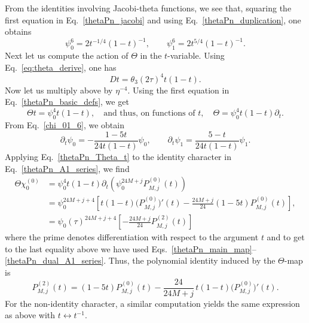 \documentclass[11pt]{article}
\newcommand\be{\begin{equation}}
\newcommand\ee{\end{equation}}
\begin{document}
From the identities involving Jacobi-theta functions, we see that, squaring the first equation in Eq.~\eqref{thetaPn_jacobi} and using Eq.~\eqref{thetaPn_duplication}, one obtains
\begin{equation}
    \psi_0^6
    =
    2t^{-1/4}(1-t)^{-1},
    \qquad
    \psi_1^6
    =
    2t^{5/4}(1-t)^{-1}.
    \label{chi_01_6}
\end{equation}
Next let us compute the action of $\Theta$ in the $t$-variable. Using Eq.~\eqref{eq:theta_derive}, one has
\begin{equation}
    Dt
    =
    \theta_3(2\tau)^4t(1-t).
    \label{thetaPn_Dt}
\end{equation}
Now let us multiply above by $\eta^{-4}$. Using the first equation in Eq.~\eqref{thetaPn_basic_defs}, we get
\begin{equation}
    \Theta t
    =
    \psi_0^4t(1-t), \quad \text{and thus, on functions of }t, \quad \Theta
    =
    \psi_0^4t(1-t)\partial_t.
    \label{thetaPn_Theta_t}
\end{equation}
From Eq.~\eqref{chi_01_6}, we obtain
\begin{equation}
    \partial_t\psi_0
    =
    -\frac{1-5t}{24t(1-t)}\psi_0,
    \qquad
    \partial_t\psi_1
    =
    \frac{5-t}{24t(1-t)}\psi_1.
    \label{thetaPn_dchi}
\end{equation}
Applying Eq.~\eqref{thetaPn_Theta_t} to the identity character in
Eq.~\eqref{thetaPn_A1_series}, we find
\be
\begin{aligned}
    \Theta\chi^{(0)}_{0}
    &=
    \psi_0^4t(1-t)\partial_t
    \left(
        \psi_0^{24M+j}P^{(0)}_{M,j}(t)
    \right)
    \\
    &=
    \psi_0^{24M+j+4}
    \left[
        t(1-t)
        \bigl(P^{(0)}_{M,j}\bigr)'(t)
        -
        \frac{24M+j}{24}
        (1-5t)P^{(0)}_{M,j}(t)
    \right], \\
    &= \psi_0(\tau)^{24M+j+4}\left[-\frac{24M+j}{24}
    P^{(2)}_{M,j}(t)\right]
    \label{thetaPn_Theta_Xn}
\end{aligned}
\ee
where the prime denotes differentiation with respect to the argument $t$ and to get to the last equality above we have used Eqs.~\eqref{thetaPn_main_map}--\eqref{thetaPn_dual_A1_series}. Thus, the polynomial identity induced by the $\Theta$-map is
\begin{equation}
    P^{(2)}_{M,j}(t)
    =
    (1-5t)P^{(0)}_{M,j}(t)
    -
    \frac{24}{24M+j}\,
    t(1-t)
    \bigl(P^{(0)}_{M,j}\bigr)'(t).
    \label{thetaPn_poly_identity}
\end{equation}
For the non-identity character, a similar computation yields the same expression as above with $t\leftrightarrow t^{-1}$. 
\end{document}
